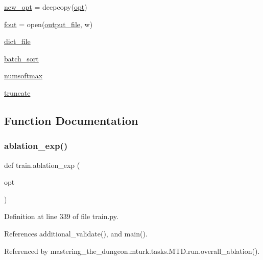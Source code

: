 \begin{DoxyCompactItemize}
\item 
\hyperlink{namespacetrain_a251b9c809d918f9575e8fac22c744b56}{new\+\_\+opt} = deepcopy(\hyperlink{namespacetrain_a8ce47f3ce85e34ed945573b80e08aaf6}{opt})
\item 
\hyperlink{namespacetrain_a824aa8f7a68ad5e626aed978e756e005}{fout} = open(\hyperlink{namespacetrain_aeaa702306f07912976fe68c59b1a1bcd}{output\+\_\+file}, \textquotesingle{}w\textquotesingle{})
\item 
\hyperlink{namespacetrain_a3bdee0332f8c1f321ec0cc91cfbae4d7}{dict\+\_\+file}
\item 
\hyperlink{namespacetrain_a8f8ae5db269e571fc4532a922fd3afa4}{batch\+\_\+sort}
\item 
\hyperlink{namespacetrain_ab8a86e94cd6c6844e5574a7c41953bea}{numsoftmax}
\item 
\hyperlink{namespacetrain_aa72e22a516ea2303faba3c129f9ba8dd}{truncate}
\end{DoxyCompactItemize}


\subsection{Function Documentation}
\mbox{\label{namespacetrain_a425ccbcfa57820b4ad788f4c71772f0f}} 
\subsubsection{\texorpdfstring{ablation\+\_\+exp()}{ablation\_exp()}}
{\footnotesize\ttfamily def train.\+ablation\+\_\+exp (\begin{DoxyParamCaption}\item[{}]{opt }\end{DoxyParamCaption})}



Definition at line 339 of file train.\+py.



References additional\+\_\+validate(), and main().



Referenced by mastering\+\_\+the\+\_\+dungeon.\+mturk.\+tasks.\+M\+T\+D.\+run.\+overall\+\_\+ablation().

